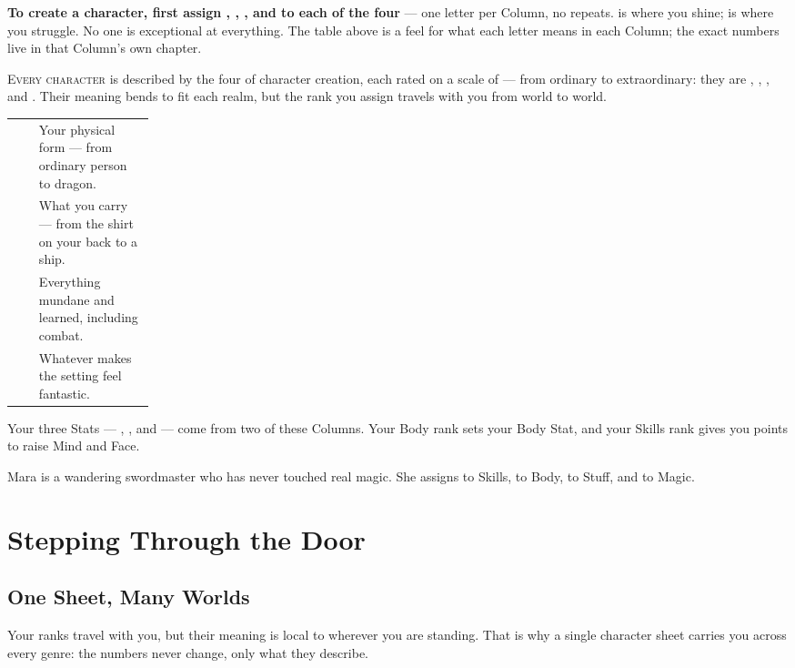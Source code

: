 \textbf{To create a character, first assign , ,
, and  to each of the four } --- one
letter per Column, no repeats.  is where you shine;  is
where you struggle. No one is exceptional at everything. The table above
is a feel for what each letter means in each Column; the exact numbers
live in that Column's own chapter.

\lettrine{E}{very character} is described by the four  of character creation, each rated on
a scale of  --- from ordinary to extraordinary: they are
, , , and .
Their meaning bends to fit each realm, but the rank you assign travels
with you from world to world.


\begin{statblock}
\begin{tabularx}{\linewidth}{@{}p{0.18\linewidth} Y@{}}
   & Your physical form --- from ordinary person to dragon.\\[3pt]
  & What you carry --- from the shirt on your back to a ship.\\[3pt]
 & Everything mundane and learned, including combat.\\[3pt]
  & Whatever makes the setting feel fantastic.\\
\end{tabularx}
\end{statblock}

Your three Stats --- , , and 
--- come from two of these Columns. Your Body rank sets your Body Stat,
and your Skills rank gives you points to raise Mind and Face.


\begin{example}
Mara is a wandering swordmaster who has never touched real magic. She
assigns  to Skills,  to Body,  to Stuff,
and  to Magic.
\end{example}

\section{Stepping Through the Door}
\lipsum[9]

\subsection*{One Sheet, Many Worlds}
Your ranks travel with you, but their meaning is local to wherever you are
standing. That is why a single character sheet carries you across every
genre: the numbers never change, only what they describe.
